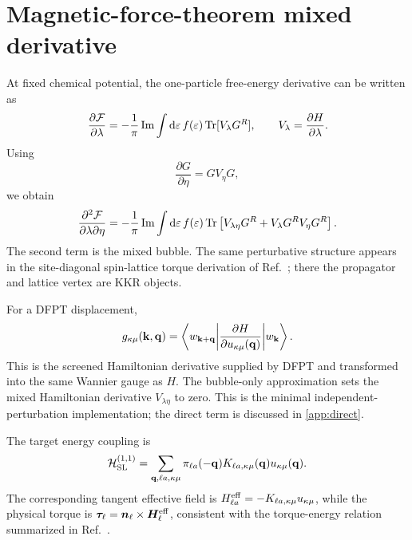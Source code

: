 \section{Magnetic-force-theorem mixed derivative}
\label{sec:mixed-response}

At fixed chemical potential, the one-particle free-energy derivative can be written as
\begin{equation}
\frac{\partial\mathcal F}{\partial\lambda}
=-\frac{1}{\pi}\operatorname{Im}
\int\mathrm{d}\varepsilon\,f(\varepsilon)
\operatorname{Tr}[V_\lambda G^R],
\qquad
V_\lambda=\frac{\partial H}{\partial\lambda}.
\label{eq:first-derivative}
\end{equation}
Using
\begin{equation}
\frac{\partial G}{\partial\eta}=GV_\eta G,
\label{eq:dyson-derivative}
\end{equation}
we obtain
\begin{equation}
\frac{\partial^2\mathcal F}{\partial\lambda\partial\eta}
=-\frac{1}{\pi}\operatorname{Im}
\int\mathrm{d}\varepsilon\,f(\varepsilon)
\operatorname{Tr}\left[V_{\lambda\eta}G^R+V_\lambda G^R V_\eta G^R\right].
\label{eq:mixed-general}
\end{equation}
The second term is the mixed bubble. The same perturbative structure appears in the site-diagonal spin-lattice torque derivation of Ref.~\cite{Mankovsky2023SLC}; there the propagator and lattice vertex are KKR objects.

For a DFPT displacement,
\begin{equation}
g_{\kappa\mu}(\mathbf k,\mathbf q)
=\left\langle w_{\mathbf k+\mathbf q}\middle|
\frac{\partial H}{\partial u_{\kappa\mu}(\mathbf q)}
\middle|w_{\mathbf k}\right\rangle.
\label{eq:dfpt-g}
\end{equation}
This is the screened Hamiltonian derivative supplied by DFPT and transformed into the same Wannier gauge as $H$. The bubble-only approximation sets the mixed Hamiltonian derivative $V_{\lambda\eta}$ to zero. This is the minimal independent-perturbation implementation; the direct term is discussed in \cref{app:direct}.

The target energy coupling is
\begin{equation}
\mathcal H_{\rm SL}^{(1,1)}
=\sum_{\mathbf q,\ell a,\kappa\mu}
\pi_{\ell a}(-\mathbf q)
K_{\ell a,\kappa\mu}(\mathbf q)
 u_{\kappa\mu}(\mathbf q).
\label{eq:coupling-energy}
\end{equation}
The corresponding tangent effective field is $H^{\rm eff}_{\ell a}=-K_{\ell a,\kappa\mu}u_{\kappa\mu}$, while the physical torque is $\bm\tau_\ell=\bm n_\ell\times\bm H^{\rm eff}_\ell$, consistent with the torque-energy relation summarized in Ref.~\cite{Mankovsky2023SLC}.
